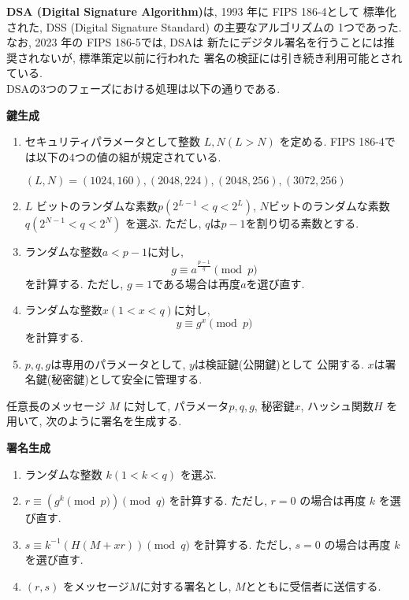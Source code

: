 \indent \textbf{DSA (Digital Signature Algorithm)}は, 1993 年に FIPS 186-4として
標準化された, DSS (Digital Signature Standard) の主要なアルゴリズムの
1つであった. なお, 2023 年の FIPS 186-5\cite{fips186-5}では, DSAは
新たにデジタル署名を行うことには推奨されないが, 標準策定以前に行われた
署名の検証には引き続き利用可能とされている.\\
\indent DSAの3つのフェーズにおける処理は以下の通りである.\\
\let\ltxlist\list
\begin{breakitembox}[l]{\textbf{鍵生成}}
  　
  \begin{enumerate}[parsep=7pt]
    \item セキュリティパラメータとして整数 $L,N (L>N)$ を定める. 
    FIPS 186-4では以下の4つの値の組が規定されている.
    \begin{center}
      $(L,N) = (1024,160), (2048,224), (2048,256), (3072,256)$
    \end{center}
    \item $L$ ビットのランダムな素数$p(2^{L-1}<q<2^{L})$, 
    $N$ビットのランダムな素数$q(2^{N-1}<q<2^{N})$ を選ぶ.
    ただし, $q$は$p-1$を割り切る素数とする. 
    \item ランダムな整数$a<p-1$に対し,
    \[
      g\equiv a^{\frac{p-1}{q}}\pmod p
    \] 
    を計算する. ただし, $g=1$である場合は再度$a$を選び直す.
    \item ランダムな整数$x(1<x<q)$に対し,
    \[
      y\equiv g^x\pmod p
    \]
    を計算する.
    \item $p,q,g$は専用のパラメータとして, $y$は検証鍵(公開鍵)として
    公開する. $x$は署名鍵(秘密鍵)として安全に管理する.
  \end{enumerate}
\end{breakitembox}
\vspace{1em}
\indent 任意長のメッセージ $M$ に対して, パラメータ$p, q, g$, 秘密鍵$x$, 
ハッシュ関数$H$ を用いて, 次のように署名を生成する.
\vspace{1em}
\let\ltxlist\list
\begin{breakitembox}[l]{\textbf{署名生成}}
  　
  \begin{enumerate}[parsep=7pt]
    \item ランダムな整数 $k(1<k<q)$ を選ぶ.
    \item $r\equiv (g^k\pmod p)\pmod q$ を計算する. 
    ただし, $r=0$ の場合は再度 $k$ を選び直す.
    \item $s\equiv k^{-1}(H(M+xr))\pmod q$ を計算する.
    ただし, $s=0$ の場合は再度 $k$ を選び直す.
    \item $(r,s)$ をメッセージ$M$に対する署名とし, 
    $M$とともに受信者に送信する.
  \end{enumerate}
\end{breakitembox}
